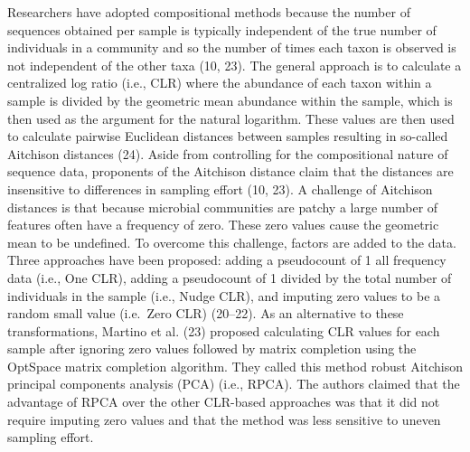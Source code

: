 \documentclass[
  11pt,
]{article}
\begin{document}
Researchers have adopted compositional methods because the number of
sequences obtained per sample is typically independent of the true
number of individuals in a community and so the number of times each
taxon is observed is not independent of the other taxa (10, 23). The
general approach is to calculate a centralized log ratio (i.e., CLR)
where the abundance of each taxon within a sample is divided by the
geometric mean abundance within the sample, which is then used as the
argument for the natural logarithm. These values are then used to
calculate pairwise Euclidean distances between samples resulting in
so-called Aitchison distances (24). Aside from controlling for the
compositional nature of sequence data, proponents of the Aitchison
distance claim that the distances are insensitive to differences in
sampling effort (10, 23). A challenge of Aitchison distances is that
because microbial communities are patchy a large number of features
often have a frequency of zero. These zero values cause the geometric
mean to be undefined. To overcome this challenge, factors are added to
the data. Three approaches have been proposed: adding a pseudocount of 1
all frequency data (i.e., One CLR), adding a pseudocount of 1 divided by
the total number of individuals in the sample (i.e., Nudge CLR), and
imputing zero values to be a random small value (i.e.~Zero CLR)
(20--22). As an alternative to these transformations, Martino et al.
(23) proposed calculating CLR values for each sample after ignoring zero
values followed by matrix completion using the OptSpace matrix
completion algorithm. They called this method robust Aitchison principal
components analysis (PCA) (i.e., RPCA). The authors claimed that the
advantage of RPCA over the other CLR-based approaches was that it did
not require imputing zero values and that the method was less sensitive
to uneven sampling effort.
\end{document}
